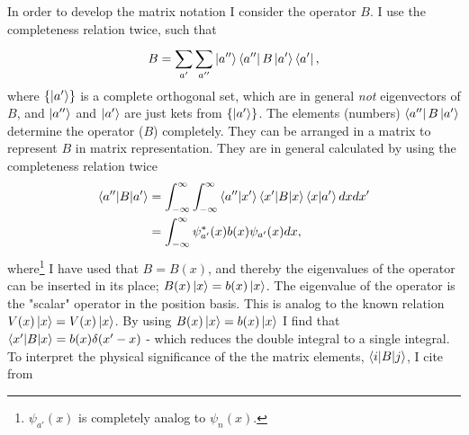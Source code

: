 In order to develop the matrix notation I consider the operator $B$. I use the completeness relation twice, such that
\begin{equation}
	B=\sum_{a'}^{}\sum_{a''}^{}\ket{a''}\bra{a''}B\ket{a'}\bra{a'},
	\label{matrixop}
\end{equation} 
where $\{\ket{a'}\}$ is a complete orthogonal set, which are in general \emph{not} eigenvectors of $B$, and $\ket{a''}$ and $\ket{a'}$ are just kets from $\{\ket{a'}\}$. The elements (numbers) $\bra{a''}B\ket{a'}$ determine the operator ($B$) completely. They can be arranged in a matrix to represent $B$ in matrix representation. They are in general calculated by using the completeness relation twice
\begin{equation}
	\begin{split}
		\braket{a''|B|a'}&=\int_{-\infty}^{\infty}\int_{-\infty}^{\infty}\braket{a''|x'}\braket{x'|B|x}\braket{x|a'}dxdx'\\
		&=\int_{-\infty}^{\infty}\psi_{a'}^*(x)b(x)\psi_{a'}(x)dx,
	\end{split}
	\label{B}
\end{equation} 
where\footnote{$\psi_{a'}(x)$ is completely analog to $\psi_n(x)$.} I have used that $B=B(x)$, and thereby the eigenvalues of the operator can be inserted in its place; $B(x)\ket{x}=b(x)\ket{x}$. The eigenvalue of the operator is the "scalar" operator in the position basis. This is analog to the known relation $V(x)\ket{x}=V(x)\ket{x}$. By using $B(x)\ket{x}=b(x)\ket{x}$ I find that $\braket{x'|B|x}=b(x)\delta(x'-x)$ - which reduces the double integral to a single integral. To interpret the physical significance of the the matrix elements, $\braket{i|B|j}$, I cite from \citet[p.45]{dirac}
